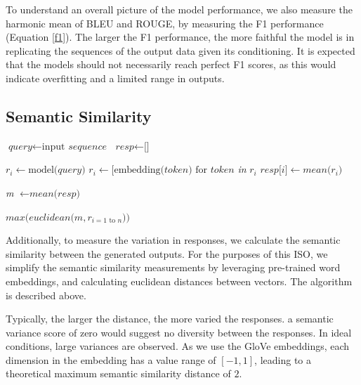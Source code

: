 \documentclass[12pt,twoside]{report}
\begin{document}
To understand an overall picture of the model performance, we also measure the harmonic mean of BLEU and ROUGE, by measuring the F1 performance (Equation \ref{f1}). The larger the F1 performance, the more faithful the model is in replicating the sequences of the output data given its conditioning. It is expected that the models should not necessarily reach perfect F1 scores, as this would indicate overfitting and a limited range in outputs.

\subsection{Semantic Similarity}

\begin{algorithm}[!ht]
	\label{similarity}
	\begin{algorithmic}[1]

	\State $\textit{query} \gets \text{input }\textit{sequence}$
	\State $\textit{resp} \gets \text{[]}$
	

		\State $r_i \gets \text{model(}\textit{query}\text{)}$
		\State $r_i \gets \text{[}\text{embedding}\text{(} token \text{) for } token $\emph{ in }$r_i$\text{]}
		\State $\textit{resp}\text{[}\textit{i}\text{]} \gets \textit{mean}\text{(}r_i\text{)}$
	\EndFor 

	\State \emph{m} $\gets \textit{mean} \text{(} \textit{resp} \text{)}$

	\State \Return $\textit{max}\text{(}\textit{euclidean}\text{(}m, r_{i=1 \text{ to } n}\text{))}$
	\EndProcedure
	\end{algorithmic}
	\end{algorithm}

Additionally, to measure the variation in responses, we calculate the semantic similarity between the generated outputs. For the purposes of this ISO, we simplify the semantic similarity measurements by leveraging pre-trained word embeddings, and calculating euclidean distances between vectors. The algorithm is described above.

Typically, the larger the distance, the more varied the responses. a semantic variance score of zero would suggest no diversity between the responses. In ideal conditions, large variances are observed. As we use the GloVe embeddings, each dimension in the embedding has a value range of $[-1,1]$, leading to a theoretical maximum semantic similarity distance of $2$.
\end{document}
